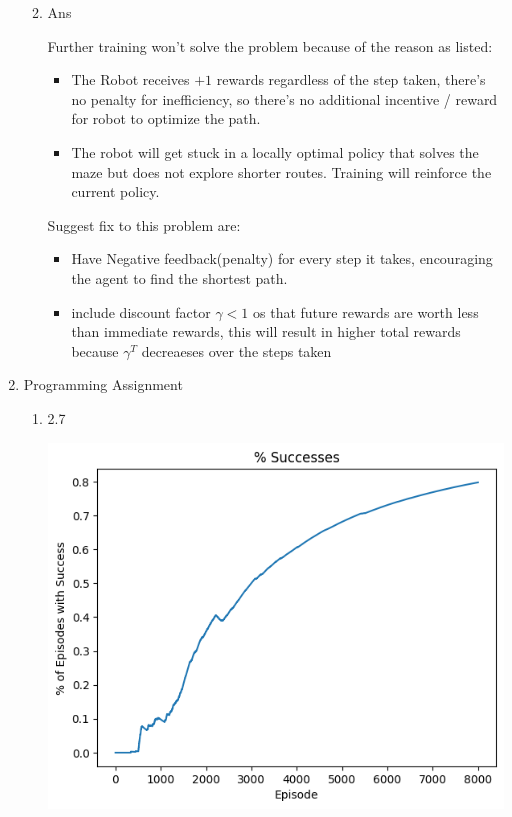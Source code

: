 \documentclass[12pt]{article}
\begin{document}
\begin{enumerate}
\begin{enumerate}
\begin{tcolorbox}
\end{tcolorbox}
\item Ans
    \begin{tcolorbox}
        Further training won't solve the problem because of the reason as listed:
        \begin{itemize}
            \item The Robot receives \(+1\) rewards regardless of the step taken, there's no penalty for inefficiency, so there's no additional incentive / reward for robot to optimize the path.
            \item The robot will get stuck in a locally optimal policy that solves the maze but does not explore shorter routes. Training will reinforce the current policy.
        \end{itemize}
        Suggest fix to this problem are:
        \begin{itemize}
            \item Have Negative feedback(penalty) for every step it takes, encouraging the agent to find the shortest path.
            \item include discount factor \(\gamma < 1\) os that future rewards are worth less than immediate rewards, this will result in higher total rewards because \(\gamma^T\) decreaeses over the steps taken
        \end{itemize}
    \end{tcolorbox}
\end{enumerate}
\item Programming Assignment
\begin{enumerate}
    \item 2.7
    \begin{center}
    \includegraphics[scale = 0.5]{images/2.7.1.png}

\end{center}
\end{enumerate}
\end{enumerate}
\end{document}
